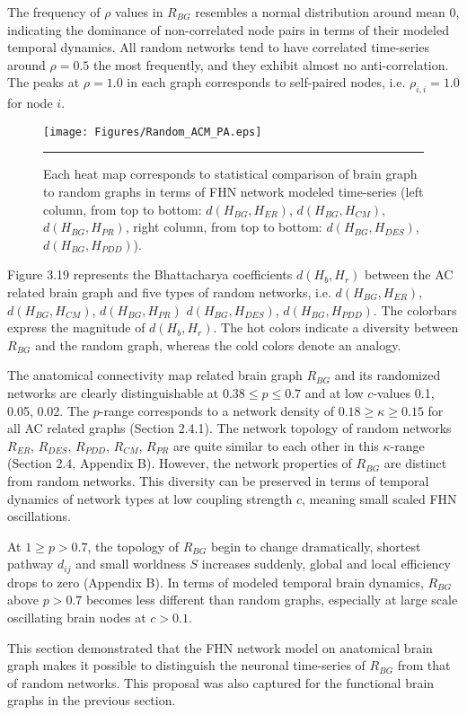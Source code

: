 The frequency of $\rho$ values in $R_{BG}$ resembles a normal distribution around mean 0, indicating the dominance of non-correlated node pairs in terms of their modeled temporal dynamics. All random networks tend to have correlated time-series around $\rho=0.5$ the most frequently, and they exhibit almost no anti-correlation. The peaks at $\rho =1.0$ in each graph corresponds to self-paired nodes, i.e. $\rho_{i,i}=1.0$ for node $i$.  



\begin{figure}[htbp]
 
  \centering

	 \texttt{[image: Figures/Random\_ACM\_PA.eps]}

	  \rule{35em}{0.5pt}  
  \caption[Random Graph Comparison, ACM]{ Each heat map corresponds to statistical comparison of brain graph to random graphs in terms of FHN network modeled time-series (left column, from top to bottom: $d(H_{BG}, H_{ER})$, $d(H_{BG}, H_{CM})$, $d(H_{BG}, H_{PR})$, right column, from top to bottom: $d(H_{BG}, H_{DES})$, $d(H_{BG}, H_{PDD})$). }
    \label{fig:Random Graph Comparison, ACM}
 	
\end{figure}  


Figure 3.19 represents the Bhattacharya coefficients $d(H_b,H_r)$ between the AC related brain  graph and five types of random networks, i.e.  $d(H_{BG}, H_{ER})$, $d(H_{BG}, H_{CM})$, $d(H_{BG}, H_{PR})$ $d(H_{BG}, H_{DES})$, $d(H_{BG}, H_{PDD})$. The colorbars express the magnitude of $d(H_b,H_r)$. The hot colors indicate a diversity between $R_{BG}$ and the random graph, whereas the cold colors denote an analogy. 

The anatomical connectivity map related brain graph $R_{BG}$ and its randomized networks are clearly distinguishable at $ 0.38 \leq p \leq 0.7$ and at low $c$-values 0.1, 0.05, 0.02. The $p$-range corresponds to a network density of $ 0.18 \geq \kappa \geq 0.15 $ for all AC related graphs (Section 2.4.1). The network topology of random networks $R_{ER}$, $R_{DES}$, $R_{PDD}$, $R_{CM}$, $R_{PR}$ are quite similar to each other in this $\kappa$-range (Section 2.4, Appendix B). However, the network properties of $R_{BG}$ are distinct from random networks. This diversity can be preserved in terms of temporal dynamics of network types at low coupling strength $c$, meaning small scaled FHN oscillations. 

At $1 \geq p>0.7$, the topology of $R_{BG}$ begin to change dramatically, shortest pathway $d_{ij}$ and small worldness $S$ increases suddenly, global and local efficiency drops to zero (Appendix B). In terms of modeled temporal brain dynamics, $R_{BG}$ above $p>0.7$ becomes less different than random graphs, especially at large scale oscillating brain nodes at $c>0.1$.  
 
This section demonstrated that the FHN network model on anatomical brain graph makes it possible to distinguish the neuronal time-series of $R_{BG}$ from that of random networks. This proposal was also captured for the functional brain graphs in the previous section. 


 